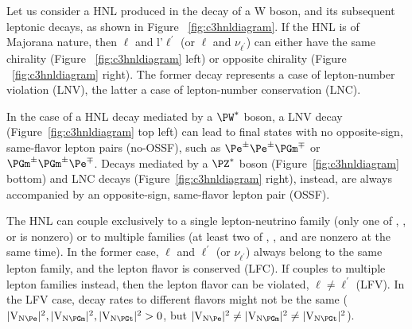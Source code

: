 


Let us consider a HNL produced in the decay of a W boson, and its subsequent leptonic decays, as shown in Figure ~\ref{fig:c3hnldiagram}. If the HNL is of Majorana nature, then $\ell$ and l'$\ell^\prime$ (or $\ell$
and $\nu_{\ell^\prime}$) can either have the same chirality (Figure ~\ref{fig:c3hnldiagram} left) or opposite chirality (Figure ~\ref{fig:c3hnldiagram} right). The former decay represents a case of lepton-number violation (LNV), the latter a case of lepton-number conservation (LNC).

In the case of a HNL decay mediated by a $\PW^\ast$ boson, a LNV decay
(Figure~\ref{fig:c3hnldiagram} top left)
can lead to final states with no opposite-sign, same-flavor lepton
pairs (no-OSSF), such as $\Pe^\pm\Pe^\pm\PGm^\mp$ or
$\PGm^\pm\PGm^\pm\Pe^\mp$.
Decays mediated by a $\PZ^\ast$ boson (Figure~\ref{fig:c3hnldiagram}
bottom) and LNC decays (Figure~\ref{fig:c3hnldiagram} right), instead, are
always accompanied by an opposite-sign, same-flavor lepton pair
(OSSF).

The HNL can couple exclusively to a single lepton-neutrino family
(\ie only one of \mixpare, \mixparm, or \mixpart is nonzero)
or to multiple families (\ie at least two of \mixpare, \mixparm,
and \mixpart are nonzero at the same time).
In the former case, $\ell$ and $\ell^\prime$ (or
$\nu_{\ell^{\prime}}$) always belong to the same lepton family,
and the lepton flavor is conserved (LFC).
If \hnl couples to multiple lepton families instead, then the
lepton flavor can be violated, $\ell\neq\ell^\prime$ (LFV).
In the LFV case, decay rates to different flavors might not be the
same ($\mixpare,\mixparm,\mixpart>0$, but
$\mixpare\neq\mixparm\neq\mixpart$).


